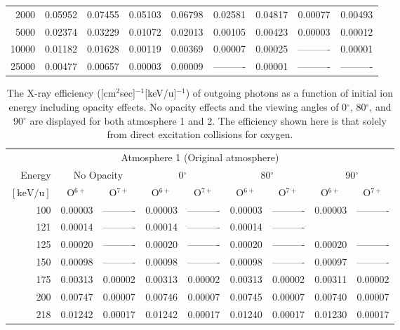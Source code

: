 \begin{table}[ht]
\begin{tabular}{r|c|c|c|c|c|c|c|c}
     2000 & 0.05952 & 0.07455 & 0.05103 & 0.06798 & 0.02581 & 0.04817 & 0.00077 & 0.00493 \\
     5000 & 0.02374 & 0.03229 & 0.01072 & 0.02013 & 0.00105 & 0.00423 & 0.00003 & 0.00012 \\
    10000 & 0.01182 & 0.01628 & 0.00119 & 0.00369 & 0.00007 & 0.00025 & ---------- & 0.00001 \\
    25000 & 0.00477 & 0.00657 & 0.00003 & 0.00009 & ---------- & 0.00001 & ---------- & ---------- \\ \cline{1-9}
    \end{tabular}
    \label{tab:XRayEffOCX}
\end{table}

\begin{table}[ht]
    \centering
    \caption{The X-ray efficiency ([cm$^2$sec]$^{-1}$[keV/u]$^{-1}$) of outgoing photons as a function of initial ion energy including opacity effects. No opacity effects and the viewing angles of 0$^\circ$, 80$^\circ$, and 90$^\circ$ are displayed for both atmosphere 1 and 2. The efficiency shown here is that solely from direct excitation collisions for oxygen.}
    \begin{tabular}{r|c|c|c|c|c|c|c|c}
    \multicolumn{9}{c}{Atmosphere 1 (Original atmosphere)} \\ \cline{2-9}
    Energy & \multicolumn{2}{c|}{No Opacity} & \multicolumn{2}{c|}{0$^\circ$} & \multicolumn{2}{c|}{80$^\circ$} & \multicolumn{2}{c}{90$^\circ$} \\ \cline{2-9}
    $\mathrm{[keV/u]}$ & O$^{6+}$ & O$^{7+}$ & O$^{6+}$ & O$^{7+}$ & O$^{6+}$ & O$^{7+}$ & O$^{6+}$ & O$^{7+}$ \\ \cline{1-9}
      100 & 0.00003 & ---------- & 0.00003 & ---------- & 0.00003 & ---------- & 0.00003 & ---------- \\
      121 & 0.00014 & ---------- & 0.00014 & ---------- & 0.00014 & ---------- \\
      125 & 0.00020 & ---------- & 0.00020 & ---------- & 0.00020 & ---------- & 0.00020 & ---------- \\
      150 & 0.00098 & ---------- & 0.00098 & ---------- & 0.00098 & ---------- & 0.00097 & ---------- \\
      175 & 0.00313 & 0.00002 & 0.00313 & 0.00002 & 0.00313 & 0.00002 & 0.00311 & 0.00002 \\
      200 & 0.00747 & 0.00007 & 0.00746 & 0.00007 & 0.00745 & 0.00007 & 0.00740 & 0.00007 \\
      218 & 0.01242 & 0.00017 & 0.01242 & 0.00017 & 0.01240 & 0.00017 & 0.01230 & 0.00017 \\

\end{tabular}
\end{table}
